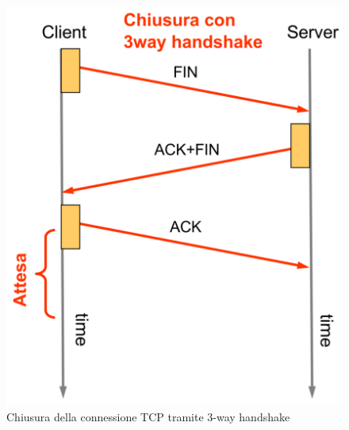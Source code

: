 \begin{figure}[h!]
\begin{minipage}{0.48\textwidth}
        \includegraphics[width=\textwidth]{images/3wayclose.png}
        \caption{Chiusura della connessione TCP tramite 3-way handshake}
        \label{fig:3wayclose}
    \end{minipage}
\end{figure}

